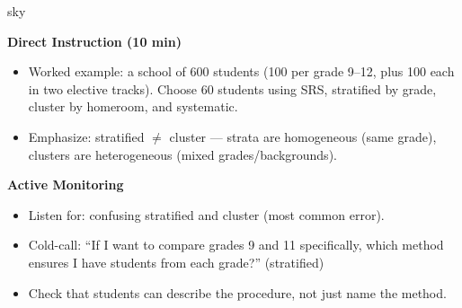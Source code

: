 \documentclass[10pt]{article}
\begin{document}
\begin{skillbox}{sky}
\begin{minipage}[t]{0.48\linewidth}
    \textbf{Direct Instruction (10 min)}
    \begin{itemize}
        \item Worked example: a school of 600 students (100 per grade 9--12, plus
              100 each in two elective tracks). Choose 60 students using SRS, stratified
              by grade, cluster by homeroom, and systematic.
        \item Emphasize: stratified $\neq$ cluster --- strata are homogeneous (same
              grade), clusters are heterogeneous (mixed grades/backgrounds).
    \end{itemize}
\end{minipage}
\hfill
\begin{minipage}[t]{0.48\linewidth}
    \textbf{Active Monitoring}
    \begin{itemize}
        \item Listen for: confusing stratified and cluster (most common error).
        \item Cold-call: ``If I want to compare grades 9 and 11 specifically, which
              method ensures I have students from each grade?'' (stratified)
        \item Check that students can describe the procedure, not just name the method.
    \end{itemize}
\end{minipage}
\end{skillbox}
\end{document}
